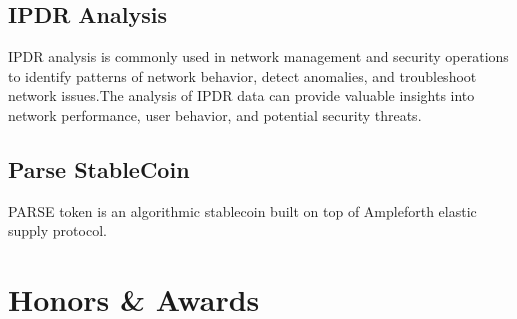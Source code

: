 \documentclass[10pt,a4paper]{moderncv}
\begin{document}
\subsection{IPDR Analysis }
\cventry{}{} {}{}{}
{IPDR analysis is commonly used in network management and security operations to identify patterns of network behavior, detect anomalies, and troubleshoot network issues.The analysis of IPDR data can provide valuable insights into network performance, user behavior, and potential security threats.}

\cventry{}{} {}{}{}{}


\subsection{Parse StableCoin}
\cventry{}{} {}{}{}
{PARSE token is an algorithmic stablecoin built on top of Ampleforth elastic supply protocol.}



\section{Honors \& Awards}



\end{document}
